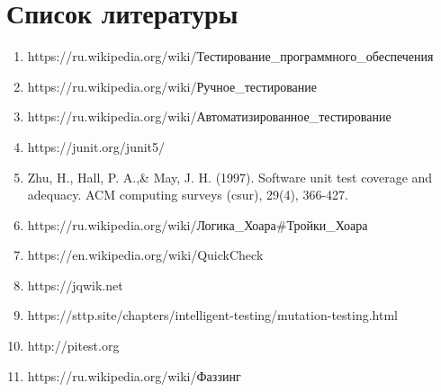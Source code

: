 \clearpage                                  %

\chapter*{Список литературы}          


\begin{enumerate}

\item https://ru.wikipedia.org/wiki/Тестирование\_программного\_обеспечения
	
\item https://ru.wikipedia.org/wiki/Ручное\_тестирование

\item https://ru.wikipedia.org/wiki/Автоматизированное\_тестирование

\item https://junit.org/junit5/

\item Zhu, H., Hall, P. A.,\& May, J. H. (1997). Software unit test coverage and adequacy. ACM computing surveys (csur), 29(4), 366-427.

\item https://ru.wikipedia.org/wiki/Логика\_Хоара#Тройки\_Хоара

\item https://en.wikipedia.org/wiki/QuickCheck

\item https://jqwik.net

\item https://sttp.site/chapters/intelligent-testing/mutation-testing.html

\item http://pitest.org

\item https://ru.wikipedia.org/wiki/Фаззинг

\end{enumerate}



